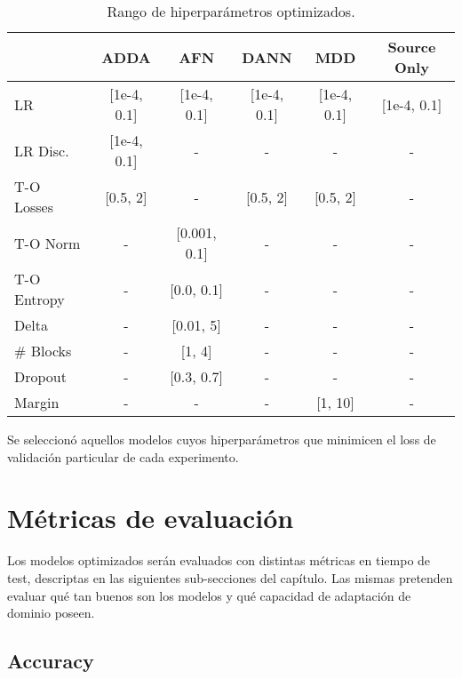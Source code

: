\begin{table}[H]
    \centering
    \begin{tabular}{lccccc}
        \toprule
                    & ADDA        & AFN          & DANN        & MDD         & Source Only \\
        \midrule
        LR          & [1e-4, 0.1] & [1e-4, 0.1]  & [1e-4, 0.1] & [1e-4, 0.1] & [1e-4, 0.1] \\
        LR Disc.    & [1e-4, 0.1] & -            & -           & -           & -           \\
        T-O Losses  & [0.5, 2]    & -            & [0.5, 2]    & [0.5, 2]    & -           \\
        T-O Norm    & -           & [0.001, 0.1] & -           & -           & -           \\
        T-O Entropy & -           & [0.0, 0.1]   & -           & -           & -           \\
        Delta       & -           & [0.01, 5]    & -           & -           & -           \\
        \# Blocks   & -           & [1, 4]       & -           & -           & -           \\
        Dropout     & -           & [0.3, 0.7]   & -           & -           & -           \\
        Margin      & -           & -            & -           & [1, 10]     & -           \\
        \bottomrule
    \end{tabular}
    \caption{Rango de hiperpar\'ametros optimizados.}
    \label{tab:rangos-hiperparametros}
\end{table}

Se seleccion\'o aquellos modelos cuyos hiperpar\'ametros que minimicen el loss de validaci\'on particular de cada
experimento.

\section{M\'etricas de evaluaci\'on}

Los modelos optimizados ser\'an evaluados con distintas m\'etricas en tiempo de test, descriptas en las siguientes
sub-secciones del cap\'itulo. Las mismas pretenden evaluar qu\'e tan buenos son los modelos y qu\'e capacidad de
adaptaci\'on de dominio poseen.

\subsection{Accuracy}

